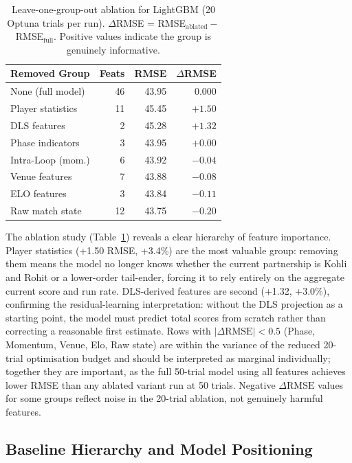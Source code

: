 \documentclass[10pt,a4paper,twocolumn]{article}
\begin{document}
\begin{table}[htbp]
\centering
\caption{Leave-one-group-out ablation for LightGBM (20 Optuna trials per run). $\Delta$RMSE = RMSE$_\text{ablated} -$ RMSE$_\text{full}$. Positive values indicate the group is genuinely informative.}
\label{tab:ablation}
\small
\begin{tabular}{lrrr}
\toprule
\textbf{Removed Group} & \textbf{Feats} & \textbf{RMSE} & $\Delta$\textbf{RMSE} \\
\midrule
None (full model) & 46 & 43.95 & 0.000 \\
\midrule
Player statistics & 11 & 45.45 & $+1.50$ \\
DLS features      &  2 & 45.28 & $+1.32$ \\
Phase indicators  &  3 & 43.95 & $+0.00$ \\
Intra-Loop (mom.) &  6 & 43.92 & $-0.04$ \\
Venue features    &  7 & 43.88 & $-0.08$ \\
ELO features      &  3 & 43.84 & $-0.11$ \\
Raw match state   & 12 & 43.75 & $-0.20$ \\
\bottomrule
\end{tabular}
\end{table}

The ablation study (Table~\ref{tab:ablation}) reveals a clear hierarchy of feature importance. Player statistics (+1.50 RMSE, +3.4\%) are the most valuable group: removing them means the model no longer knows whether the current partnership is Kohli and Rohit or a lower-order tail-ender, forcing it to rely entirely on the aggregate current score and run rate. DLS-derived features are second (+1.32, +3.0\%), confirming the residual-learning interpretation: without the DLS projection as a starting point, the model must predict total scores from scratch rather than correcting a reasonable first estimate. Rows with $|\Delta\text{RMSE}| < 0.5$ (Phase, Momentum, Venue, Elo, Raw state) are within the variance of the reduced 20-trial optimisation budget and should be interpreted as marginal individually; together they are important, as the full 50-trial model using all features achieves lower RMSE than any ablated variant run at 50 trials. Negative $\Delta\text{RMSE}$ values for some groups reflect noise in the 20-trial ablation, not genuinely harmful features.

\subsection{Baseline Hierarchy and Model Positioning}
\end{document}
